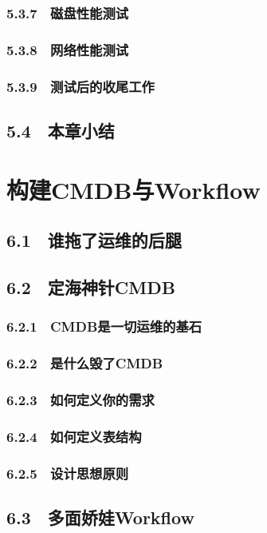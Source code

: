 \documentclass[12pt,UTF8]{ctexbook}
\begin{document}
\subsection{5.3.7　磁盘性能测试}
\subsection{5.3.8　网络性能测试}
\subsection{5.3.9　测试后的收尾工作}
\section{5.4　本章小结}
\chapter{构建CMDB与Workflow}
\section{6.1　谁拖了运维的后腿}
\section{6.2　定海神针CMDB}
\subsection{6.2.1　CMDB是一切运维的基石}
\subsection{6.2.2　是什么毁了CMDB}
\subsection{6.2.3　如何定义你的需求}
\subsection{6.2.4　如何定义表结构}
\subsection{6.2.5　设计思想原则}
\section{6.3　多面娇娃Workflow}
\end{document}

